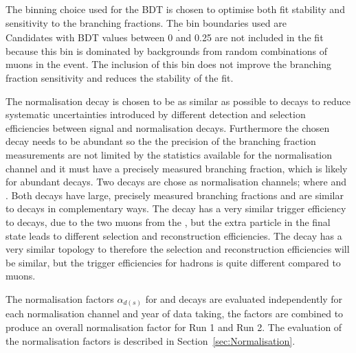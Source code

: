 The binning choice used for the BDT is chosen to optimise both fit stability and sensitivity to the \bmumu branching fractions. The bin boundaries used are
\begin{equation}
[0.25, 0.4, 0.5, 0.6, 1.0].
\label{eq:BDTbins}
\end{equation}
Candidates with BDT values between 0 and 0.25 are not included in the fit because this bin is dominated by backgrounds from random combinations of muons in the event. The inclusion of this bin does not improve the branching fraction sensitivity and reduces the stability of the fit. %

The normalisation decay is chosen to be as similar as possible to \bmumu decays to reduce systematic uncertainties introduced by different detection and selection efficiencies between signal and normalisation decays. Furthermore the chosen decay needs to be abundant so the the precision of the \bmumu branching fraction measurements are not limited by the statistics available for the normalisation channel and it must have a precisely measured branching fraction, which is likely for abundant decays. Two decays are chose as normalisation channels; \bujpsik where \jpsimumu and \bdkpi. Both decays have large, precisely measured branching fractions and are similar to \bmumu decays in complementary ways. The \bujpsik decay has a very similar trigger efficiency to \bmumu decays, due to the two muons from the \jpsi, but the extra particle in the final state leads to different selection and reconstruction efficiencies. The \bdkpi decay has a very similar topology to \bmumu therefore the selection and reconstruction efficiencies will be similar, but the trigger efficiencies for hadrons is quite different compared to muons.  

The normalisation factors $\alpha_{d(s)}$ for \bdmumu and \bsmumu decays are evaluated independently for each normalisation channel and year of data taking, the factors are combined to produce an overall normalisation factor for Run 1 and Run 2. The evaluation of the normalisation factors is described in Section~\ref{sec:Normalisation}.




